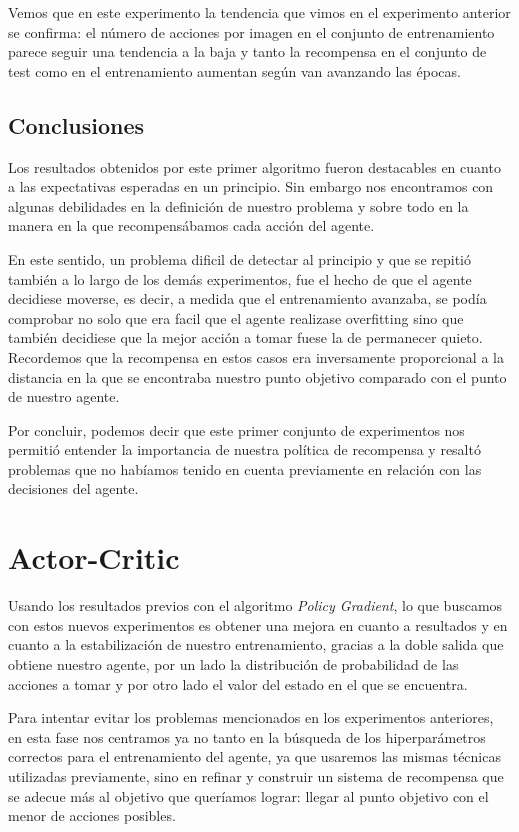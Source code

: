Vemos que en este experimento la tendencia que vimos en el experimento anterior se confirma: el número de acciones por imagen en el conjunto de entrenamiento parece seguir una tendencia a la baja y tanto la recompensa en el conjunto de test como en el entrenamiento aumentan según van avanzando las épocas.
\medskip

\subsection{Conclusiones}
\label{resultados-policy-gradient-conclusiones}

Los resultados obtenidos por este primer algoritmo fueron destacables en cuanto a las expectativas esperadas en un principio. Sin embargo nos encontramos con algunas debilidades en la definición de nuestro problema y sobre todo en la manera en la que recompensábamos cada acción del agente.
\medskip

En este sentido, un problema dificil de detectar al principio y que se repitió también a lo largo de los demás experimentos, fue el hecho de que el agente decidiese moverse, es decir, a medida que el entrenamiento avanzaba, se podía comprobar no solo que era facil que el agente realizase overfitting sino que también decidiese que la mejor acción a tomar fuese la de permanecer quieto. Recordemos que la recompensa en estos casos era inversamente proporcional a la distancia en la que se encontraba nuestro punto objetivo comparado con el punto de nuestro agente.
\medskip

Por concluir, podemos decir que este primer conjunto de experimentos nos permitió entender la importancia de nuestra política de recompensa y resaltó problemas que no habíamos tenido en cuenta previamente en relación con las decisiones del agente.
\medskip


\section{Actor-Critic}
\label{resultados-actor-critic}

Usando los resultados previos con el algoritmo \textit{Policy Gradient}, lo que buscamos con estos nuevos experimentos es obtener una mejora en cuanto a resultados y en cuanto a la estabilización de nuestro entrenamiento, gracias a la doble salida que obtiene nuestro agente, por un lado la distribución de probabilidad de las acciones a tomar y por otro lado el valor del estado en el que se encuentra.
\medskip

Para intentar evitar los problemas mencionados en los experimentos anteriores, en esta fase nos centramos ya no tanto en la búsqueda de los hiperparámetros correctos para el entrenamiento del agente, ya que usaremos las mismas técnicas utilizadas previamente, sino en refinar y construir un sistema de recompensa que se adecue más al objetivo que queríamos lograr: llegar al punto objetivo con el menor de acciones posibles.
\medskip

